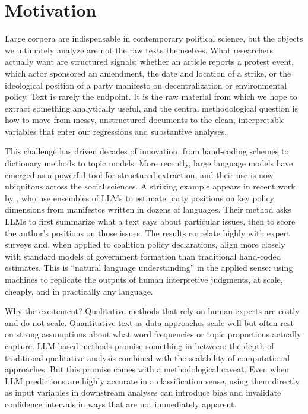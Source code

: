 \section{Motivation}\label{sec:motivation}

Large corpora are indispensable in contemporary political science, but the objects we ultimately analyze are not the raw texts themselves. What researchers actually want are structured signals: whether an article reports a protest event, which actor sponsored an amendment, the date and location of a strike, or the ideological position of a party manifesto on decentralization or environmental policy. Text is rarely the endpoint. It is the raw material from which we hope to extract something analytically useful, and the central methodological question is how to move from messy, unstructured documents to the clean, interpretable variables that enter our regressions and substantive analyses.

This challenge has driven decades of innovation, from hand-coding schemes to dictionary methods to topic models. More recently, large language models have emerged as a powerful tool for structured extraction, and their use is now ubiquitous across the social sciences. A striking example appears in recent work by \citet{BenoitEtAl2025}, who use ensembles of LLMs to estimate party positions on key policy dimensions from manifestos written in dozens of languages. Their method asks LLMs to first summarize what a text says about particular issues, then to score the author's positions on those issues. The results correlate highly with expert surveys and, when applied to coalition policy declarations, align more closely with standard models of government formation than traditional hand-coded estimates. This is ``natural language understanding'' in the applied sense: using machines to replicate the outputs of human interpretive judgments, at scale, cheaply, and in practically any language.

Why the excitement? Qualitative methods that rely on human experts are costly and do not scale. Quantitative text-as-data approaches scale well but often rest on strong assumptions about what word frequencies or topic proportions actually capture. LLM-based methods promise something in between: the depth of traditional qualitative analysis combined with the scalability of computational approaches. But this promise comes with a methodological caveat. Even when LLM predictions are highly accurate in a classification sense, using them directly as input variables in downstream analyses can introduce bias and invalidate confidence intervals in ways that are not immediately apparent.

